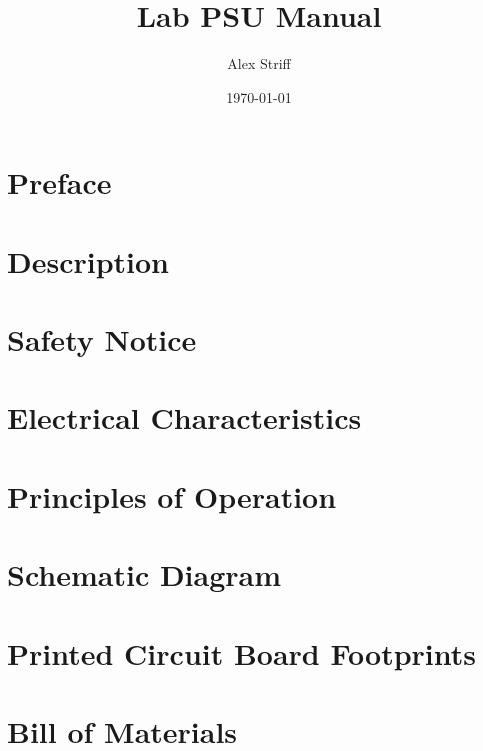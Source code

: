 \documentclass[letterpaper,twocolumn,11pt]{article}
\title{Lab PSU Manual}
\author{Alex Striff}
\date{\today}
\begin{document}
\maketitle
\tableofcontents
\thispagestyle{empty}

\section{Preface}

\section{Description}

\section{Safety Notice}

\section{Electrical Characteristics}

\section{Principles of Operation}

\section{Schematic Diagram}

\section{Printed Circuit Board Footprints}

\section{Bill of Materials}
\end{document}
